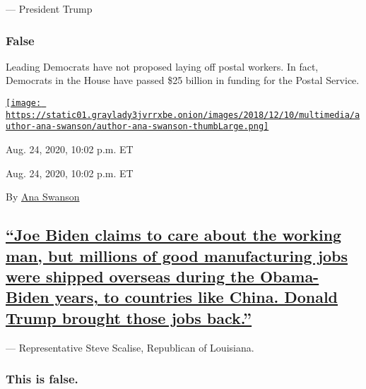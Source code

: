 --- President Trump

\hypertarget{false-1}{%
\subsubsection{False}\label{false-1}}

Leading Democrats have not proposed laying off postal workers. In fact,
Democrats in the House have passed \$25 billion in funding for the
Postal Service.

\href{https://www.nytimes3xbfgragh.onion/by/ana-swanson}{\texttt{[image: https://static01.graylady3jvrrxbe.onion/images/2018/12/10/multimedia/author-ana-swanson/author-ana-swanson-thumbLarge.png]}}

Aug. 24, 2020, 10:02 p.m. ET

Aug. 24, 2020, 10:02 p.m. ET

By \href{https://www.nytimes3xbfgragh.onion/by/ana-swanson}{Ana Swanson}

\hypertarget{joe-biden-claims-to-care-about-the-working-man-but-millions-of-good-manufacturing-jobs-were-shipped-overseas-during-the-obama-biden-years-to-countries-like-china-donald-trump-brought-those-jobs-back}{%
\subsection{\texorpdfstring{\protect\hyperlink{joe-biden-claims-to-care-about-the-working-man-but-millions-of-good-manufacturing-jobs-were-shipped-overseas-during-the-obama-bi}{``Joe
Biden claims to care about the working man, but millions of good
manufacturing jobs were shipped overseas during the Obama-Biden years,
to countries like China. Donald Trump brought those jobs
back.''}}{``Joe Biden claims to care about the working man, but millions of good manufacturing jobs were shipped overseas during the Obama-Biden years, to countries like China. Donald Trump brought those jobs back.''}}\label{joe-biden-claims-to-care-about-the-working-man-but-millions-of-good-manufacturing-jobs-were-shipped-overseas-during-the-obama-biden-years-to-countries-like-china-donald-trump-brought-those-jobs-back}}

--- Representative Steve Scalise, Republican of Louisiana.

\hypertarget{this-is-false-}{%
\subsubsection{\texorpdfstring{\textbf{This is false.}
}{This is false. }}\label{this-is-false-}}

